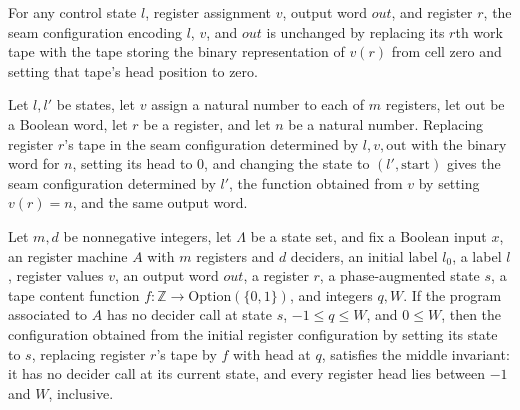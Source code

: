 \begin{lemma}
\label{Complexity.LogProg.aseam_eq_regCfg}
\leanok
{}
For any control state $l$, register assignment $v$, output word $out$, and register $r$,
the seam configuration encoding $l$, $v$, and $out$ is unchanged by replacing its $r$th
work tape with the tape storing the binary representation of $v(r)$ from cell zero and
setting that tape's head position to zero.
\end{lemma}

\begin{lemma}
\label{Complexity.LogProg.regCfg_aseam}
\leanok
{}
Let $l,l'$ be states, let $v$ assign a natural number to each of $m$ registers, let
$\mathrm{out}$ be a Boolean word, let $r$ be a register, and let $n$ be a natural
number. Replacing register $r$'s tape in the seam configuration determined by
$l,v,\mathrm{out}$ with the binary word for $n$, setting its head to $0$, and changing
the state to $(l',\mathrm{start})$ gives the seam configuration determined by $l'$, the
function obtained from $v$ by setting $v(r)=n$, and the same output word.
\end{lemma}

\begin{lemma}
\label{Complexity.LogProg.mid_regCfg}
\leanok
{}
Let $m,d$ be nonnegative integers, let $\Lambda$ be a state set, and fix a Boolean input
$x$, an register machine $A$ with $m$ registers and $d$ deciders, an initial label
$l_0$, a label $l$, register values $v$, an output word $out$, a register $r$, a
phase-augmented state $s$, a tape content function $f:\mathbb
Z\to\mathrm{Option}(\{0,1\})$, and integers $q,W$. If the program associated to $A$ has
no decider call at state $s$, $-1\le q\le W$, and $0\le W$, then the configuration
obtained from the initial register configuration by setting its state to $s$, replacing
register $r$'s tape by $f$ with head at $q$, satisfies the middle invariant: it has no
decider call at its current state, and every register head lies between $-1$ and $W$,
inclusive.
\end{lemma}


